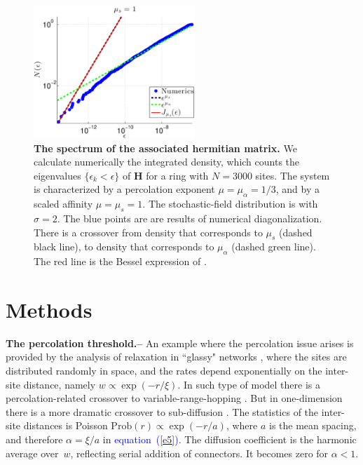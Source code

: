 \documentclass[aps,pre,floats,floatfix,twocolumn]{revtex4}
\newcommand{\Eq}[1]{\textcolor{blue}{{equation}\!~(\ref{#1})}}
\newcommand{\sect}[1]{{\bf #1.-- }}
\begin{document}
\begin{figure}
\includegraphics[height=5cm]{N_E_1_1_french}

\caption{\label{fdos}
{\bf The spectrum of the associated hermitian matrix.}
We calculate numerically the integrated density, 
which counts the eigenvalues ${\{\epsilon_k<\epsilon\}}$ of $\bm{H}$ 
for a ring with $N{=}3000$ sites. 
The system is characterized by a percolation exponent ${\mu=\mu_{\alpha}=1/3}$, 
and by a scaled affinity ${\mu=\mu_s=1}$. 
The stochastic-field distribution is with $\sigma{=}2$. 
The blue points are are results of numerical diagonalization. 
There is a crossover from density that corresponds to $\mu_s$ (dashed black line), 
to density that corresponds to $\mu_{\alpha}$ (dashed green line). 
The red line is the Bessel expression of \cite{odh3}. 
}
\end{figure}




\section{Methods}  

\sect{The percolation threshold}
%
An example where the percolation issue arises is provided by 
the analysis of relaxation in ``glassy" networks \cite{ege,egt}, 
where the sites are distributed randomly in space, 
and the rates depend exponentially on the inter-site distance, 
namely ${w \propto \exp(-r/\xi)}$. 
In such type of model there is a percolation-related crossover 
to variable-range-hopping \cite{pts}. But in one-dimension
there is a more dramatic crossover to sub-diffusion \cite{Alexander}.
The statistics of the inter-site distances is Poisson ${\text{Prob}(r) \propto \exp(-r/a)}$, 
where $a$ is the mean spacing, and therefore ${\alpha=\xi/a}$ in \Eq{e5}.     
The diffusion coefficient is the harmonic average over~$w$, 
reflecting serial addition of connectors. It becomes zero for ${\alpha<1}$. 
\end{document}
